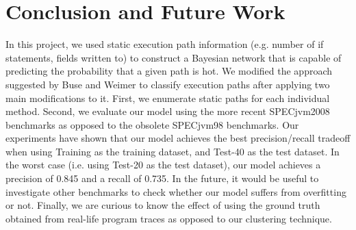 \documentclass[10pt,twocolumn,letterpaper]{article}
\begin{document}
\section{Conclusion and Future Work}
\label{sec:conc}
In this project, we used static execution path information (e.g. number of if statements, fields written to) to construct a Bayesian network that is
capable of predicting the probability that a given path is hot. We modified the approach suggested by Buse and Weimer \cite{buse2009road} to classify
execution paths after applying two main modifications to it. First, we enumerate static paths for each individual method. Second, we evaluate our model using
the more recent SPECjvm2008 \cite{specjvm2008} benchmarks as opposed to the obsolete SPECjvm98 \cite{specjvm98} benchmarks. Our experiments have shown that our
model achieves the best precision/recall tradeoff when using Training as the training dataset, and Test-40 as the test dataset. In the worst case (i.e. using
Test-20 as the test dataset), our model achieves a precision of 0.845 and a recall of 0.735. In the future, it would be useful to investigate other benchmarks
to check whether our model suffers from overfitting or not. Finally, we are curious to know the effect of using the ground truth obtained from
real-life program traces as opposed to our clustering technique.

{\small


}
\end{document}
